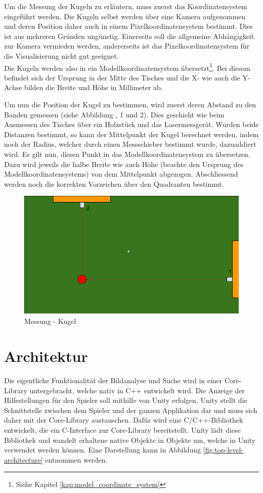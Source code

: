 Um die Messung der Kugeln zu erläutern, muss zuerst das Koordinatensystem eingeführt werden. Die Kugeln selbst werden
über eine Kamera aufgenommen und deren Position daher auch in einem Pixelkoordinatensystem bestimmt. Dies ist aus
mehreren Gründen ungünstig. Einerseits soll die allgemeine Abhängigkeit zur Kamera vermieden werden, andererseits ist das
Pixelkoordinatensystem für die Visualisierung nicht gut geeignet.\\
Die Kugeln werden also in ein Modellkoordinatensystem übersetzt\footnote{Siehe Kapitel \ref{kap:model_coordinate_system}}.
Bei diesem befindet sich der Ursprung in der Mitte des Tisches und die X- wie auch die Y-Achse bilden die Breite und Höhe
in Millimeter ab.

Um nun die Position der Kugel zu bestimmen, wird zuerst deren Abstand zu den Banden gemessen (siehe Abbildung \label{fig:messung:kugel}, 1 und 2).
Dies geschieht wie beim Ausmessen des Tisches über ein Holzstück und das Lasermessgerät. Wurden beide Distanzen bestimmt, so
kann der Mittelpunkt der Kugel berechnet werden, indem noch der Radius, welcher durch einen Messschieber bestimmt wurde, dazuaddiert wird.
Es gilt nun, diesen Punkt in das Modellkoordinatensystem zu übersetzen. Dazu wird jeweils die halbe Breite wie auch Höhe
(beachte den Ursprung des Modellkoordinatensystems) von dem Mittelpunkt abgezogen. Abschliessend werden noch die korrekten
Vorzeichen über den Quadranten bestimmt.

\begin{figure}[h!]
    \begin{center}
        \includegraphics[width=0.8\linewidth]{../common/03_billiard_ai/resources/02_messung_kugel.png}
    \end{center}
    \caption{Messung - Kugel}
    \label{fig:messung:kugel}
\end{figure}

\section{Architektur}
Die eigentliche Funktionalität der Bildanalyse und Suche wird in einer Core-Library untergebracht, welche nativ in C++ entwickelt wird.
Die Anzeige der Hilfestellungen für den Spieler soll mithilfe von Unity erfolgen. Unity stellt die Schnittstelle zwischen
dem Spieler und der ganzen Applikation dar und muss sich daher mit der Core-Library austauschen.
Dafür wird eine C/C++-Bibliothek entwickelt, die ein C-Interface zur Core-Library bereitstellt.
Unity lädt diese Bibliothek und wandelt erhaltene native Objekte in Objekte um, welche in Unity verwendet werden können.
Eine Darstellung kann in Abbildung \ref{fig:top-level-architecture} entnommen werden.

